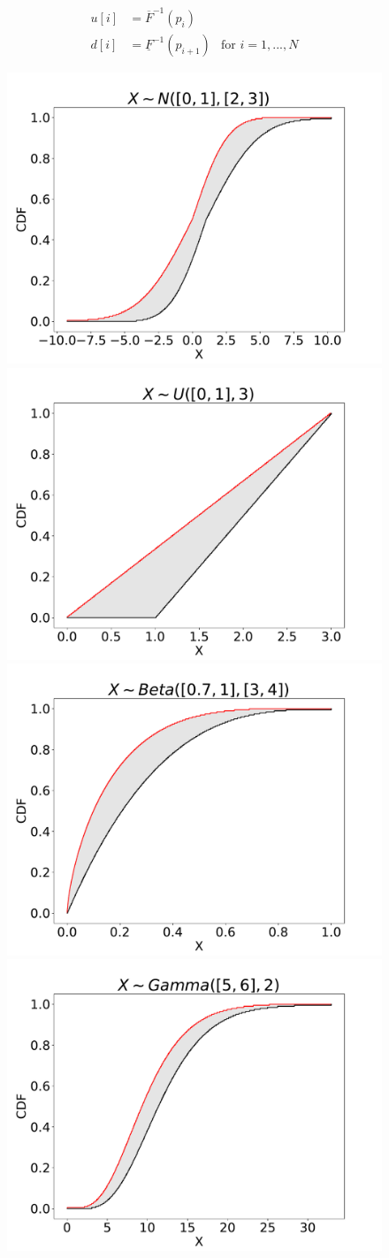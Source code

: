\documentclass{juliacon}
\begin{document}
\begin{align*}
  u[i] &= \overline{F}^{-1}(p_{i}) \\ 
  d[i] &= \underline{F}^{-1}(p_{i+1}) & \text{for } i = 1, ..., N
\end{align*}



\begin{figure}[htp]

  \centering
  \includegraphics[width=.25\textwidth]{../examples/JuliaCon/fig3/normal.pdf}\hfill
  \includegraphics[width=.25\textwidth]{../examples/JuliaCon/fig3/uniform.pdf}\hfill
  \includegraphics[width=.25\textwidth]{../examples/JuliaCon/fig3/beta.pdf}\hfill
  \includegraphics[width=.25\textwidth]{../examples/JuliaCon/fig3/gamma.pdf}
  


\end{figure}
\end{document}
